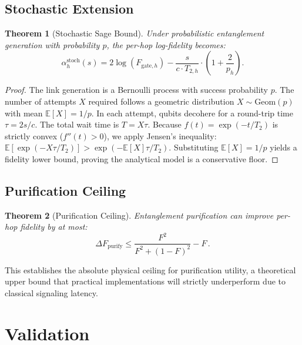 \documentclass[aps,pra,reprint,amsmath,amssymb,superscriptaddress]{revtex4-2}
\newtheorem{theorem}{Theorem}
\begin{document}
\subsection{Stochastic Extension}

\begin{theorem}[Stochastic Sage Bound]
\label{thm:stochastic}
Under probabilistic entanglement generation with probability $p$, the per-hop log-fidelity becomes:
\begin{equation}
\alpha_h^{\text{stoch}}(s) = 2\log(F_{\text{gate},h}) - \frac{s}{c \cdot T_{2,h}} \cdot \left(1 + \frac{2}{p_h}\right) .
\end{equation}
\end{theorem}

\begin{proof}
The link generation is a Bernoulli process with success probability $p$. The number of attempts $X$ required follows a geometric distribution $X \sim \text{Geom}(p)$ with mean $\mathbb{E}[X] = 1/p$. In each attempt, qubits decohere for a round-trip time $\tau = 2s/c$. The total wait time is $T = X\tau$. Because $f(t) = \exp(-t/T_2)$ is strictly convex ($f''(t) > 0$), we apply Jensen's inequality: $\mathbb{E}[\exp(-X\tau/T_2)] > \exp(-\mathbb{E}[X]\tau/T_2)$. Substituting $\mathbb{E}[X] = 1/p$ yields a fidelity lower bound, proving the analytical model is a conservative floor.
\end{proof}

\subsection{Purification Ceiling}

\begin{theorem}[Purification Ceiling]
\label{thm:purification}
Entanglement purification can improve per-hop fidelity by at most:
\begin{equation}
\Delta F_{\text{purify}} \leq \frac{F^2}{F^2 + (1-F)^2} - F \,.
\end{equation}
\end{theorem}
This establishes the absolute physical ceiling for purification utility, a theoretical upper bound that practical implementations will strictly underperform due to classical signaling latency.


\section{Validation}
\end{document}
